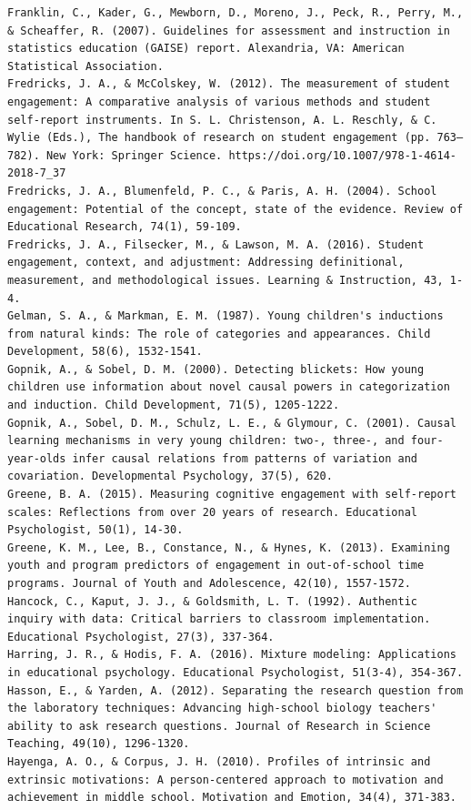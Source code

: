 \documentclass[]{book}
\theoremstyle{definition}
\theoremstyle{definition}
\theoremstyle{definition}
\theoremstyle{remark}
\begin{document}
\begin{verbatim}
Franklin, C., Kader, G., Mewborn, D., Moreno, J., Peck, R., Perry, M., & Scheaffer, R. (2007). Guidelines for assessment and instruction in statistics education (GAISE) report. Alexandria, VA: American Statistical Association.  
Fredricks, J. A., & McColskey, W. (2012). The measurement of student engagement: A comparative analysis of various methods and student self-report instruments. In S. L. Christenson, A. L. Reschly, & C. Wylie (Eds.), The handbook of research on student engagement (pp. 763–782). New York: Springer Science. https://doi.org/10.1007/978-1-4614-2018-7_37  
Fredricks, J. A., Blumenfeld, P. C., & Paris, A. H. (2004). School engagement: Potential of the concept, state of the evidence. Review of Educational Research, 74(1), 59-109.  
Fredricks, J. A., Filsecker, M., & Lawson, M. A. (2016). Student engagement, context, and adjustment: Addressing definitional, measurement, and methodological issues. Learning & Instruction, 43, 1-4.  
Gelman, S. A., & Markman, E. M. (1987). Young children's inductions from natural kinds: The role of categories and appearances. Child Development, 58(6), 1532-1541.  
Gopnik, A., & Sobel, D. M. (2000). Detecting blickets: How young children use information about novel causal powers in categorization and induction. Child Development, 71(5), 1205-1222.  
Gopnik, A., Sobel, D. M., Schulz, L. E., & Glymour, C. (2001). Causal learning mechanisms in very young children: two-, three-, and four-year-olds infer causal relations from patterns of variation and covariation. Developmental Psychology, 37(5), 620.  
Greene, B. A. (2015). Measuring cognitive engagement with self-report scales: Reflections from over 20 years of research. Educational Psychologist, 50(1), 14-30.  
Greene, K. M., Lee, B., Constance, N., & Hynes, K. (2013). Examining youth and program predictors of engagement in out-of-school time programs. Journal of Youth and Adolescence, 42(10), 1557-1572.  
Hancock, C., Kaput, J. J., & Goldsmith, L. T. (1992). Authentic inquiry with data: Critical barriers to classroom implementation. Educational Psychologist, 27(3), 337-364.  
Harring, J. R., & Hodis, F. A. (2016). Mixture modeling: Applications in educational psychology. Educational Psychologist, 51(3-4), 354-367.  
Hasson, E., & Yarden, A. (2012). Separating the research question from the laboratory techniques: Advancing high‐school biology teachers' ability to ask research questions. Journal of Research in Science Teaching, 49(10), 1296-1320.  
Hayenga, A. O., & Corpus, J. H. (2010). Profiles of intrinsic and extrinsic motivations: A person-centered approach to motivation and achievement in middle school. Motivation and Emotion, 34(4), 371-383.  

\end{verbatim}
\end{document}
